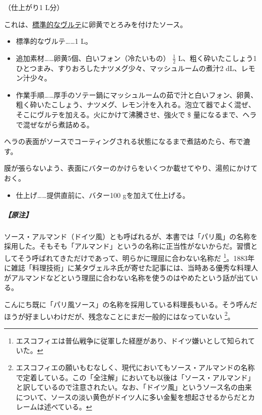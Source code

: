 \begin{recette}
（仕上がり1 L分）

これは、\protect\hyperlink{veloute}{標準的なヴルテ}に卵黄でとろみを付けたソース。

\begin{itemize}
\item
  標準的なヴルテ\ldots{}\ldots{}1 L。
\item
  追加素材\ldots{}\ldots{}卵黄5個、白いフォン（冷たいもの）
  \(\frac{1}{2}\)
  L、粗く砕いたこしょう1ひとつまみ、すりおろしたナツメグ少々、マッシュルームの煮汁2
  dL、レモン汁少々。
\item
  作業手順\ldots{}\ldots{}厚手のソテー鍋にマッシュルームの茹で汁と白いフォン、卵黄、粗く砕いたこしょう、ナツメグ、レモン汁を入れる。泡立て器でよく混ぜ、そこにヴルテを加える。火にかけて沸騰させ、強火で
  \$ 量になるまで、ヘラで混ぜながら煮詰める。
\end{itemize}

ヘラの表面がソースでコーティングされる状態になるまで煮詰めたら、布で漉す。

膜が張らないよう、表面にバターのかけらをいくつか載せてやり、湯煎にかけておく。

\begin{itemize}
\tightlist
\item
  仕上げ\ldots{}\ldots{}提供直前に、バター100 gを加えて仕上げる。
\end{itemize}

\hypertarget{nota-sauce-allemande}{%
\subparagraph{【原注】}\label{nota-sauce-allemande}}

ソース・アルマンド（ドイツ風）とも呼ばれるが、本書では「パリ風」の名称を採用した。そもそも「アルマンド」というの名称に正当性がないからだ。習慣としてそう呼ばれてきただけであって、明らかに理屈に合わない名称だ
\footnote{エスコフィエは普仏戦争に従軍した経歴があり、ドイツ嫌いとして知られていた。}。1883年に雑誌「料理技術」に某タヴェルネ氏が寄せた記事には、当時ある優秀な料理人がアルマンドなどという理屈に合わない名称を使うのはやめたという話が出ている。

こんにち既に「パリ風ソース」の名称を採用している料理長もいる。そう呼んだほうが好ましいわけだが、残念なことにまだ一般的にはなっていない
\footnote{エスコフィエの願いもむなしく、現代においてもソース・アルマンドの名称で定着している。この「全注解」においても以後は「ソース・アルマンド」と訳しているので注意されたい。なお、「ドイツ風」というソース名の由来について、ソースの淡い黄色がドイツ人に多い金髪を想起させるからだとカレームは述べている。}。

\atoaki{}


\end{recette}
